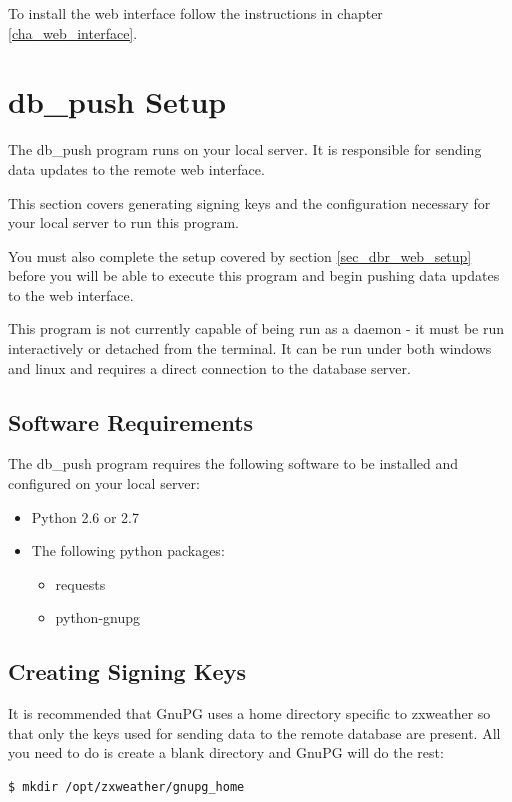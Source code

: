 \documentclass[a4paper,10pt,draft]{book}
\begin{document}
To install the web interface follow the instructions in chapter \ref{cha_web_interface}.

\section{db\_push Setup}
The db\_push program runs on your local server. It is responsible for sending data updates to the remote web interface. 

This section covers generating signing keys and the configuration necessary for your local server to run this program.

You must also complete the setup covered by section \ref{sec_dbr_web_setup} before you will be able to execute this program and begin pushing data updates to the web interface.

This program is not currently capable of being run as a daemon - it must be run interactively or detached from the terminal. It can be run under both windows and linux and requires a direct connection to the database server.

\subsection{Software Requirements}
The db\_push program requires the following software to be installed and configured on your local server:
\begin{itemize}
\item Python 2.6 or 2.7
\item The following python packages:
\begin{itemize}
\item requests
\item python-gnupg
\end{itemize}
\end{itemize}

\subsection{Creating Signing Keys}
\label{subsec_dbr_create_keys}

It is recommended that GnuPG uses a home directory specific to zxweather so that only the keys used for sending data to the remote database are present. All you need to do is create a blank directory and GnuPG will do the rest:

\begin{verbatim}
$ mkdir /opt/zxweather/gnupg_home
\end{verbatim}
\end{document}
